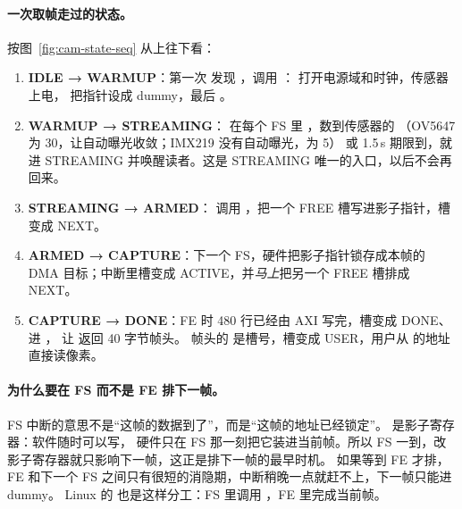 \paragraph{一次取帧走过的状态。}
按图~\ref{fig:cam-state-seq} 从上往下看：
\begin{enumerate}
  \item \textbf{IDLE → WARMUP}：第一次  发现 ，调用 ：
        打开电源域和时钟，传感器上电， 把指针设成 dummy，最后 。
  \item \textbf{WARMUP → STREAMING}： 在每个 FS 里 ，数到传感器的 （OV5647 为 30，让自动曝光收敛；IMX219 没有自动曝光，为 5）
        或 1.5\,s 期限到，就进 STREAMING 并唤醒读者。这是 STREAMING 唯一的入口，以后不会再回来。
  \item \textbf{STREAMING → ARMED}： 调用 ，把一个 FREE 槽写进影子指针，槽变成 NEXT。
  \item \textbf{ARMED → CAPTURE}：下一个 FS，硬件把影子指针锁存成本帧的 DMA 目标；中断里槽变成 ACTIVE，并\emph{马上}把另一个 FREE 槽排成 NEXT。
  \item \textbf{CAPTURE → DONE}：FE 时 480 行已经由 AXI 写完，槽变成 DONE、进 ， 让  返回 40 字节帧头。
        帧头的  是槽号，槽变成 USER，用户从  的地址直接读像素。
\end{enumerate}

\paragraph{为什么要在 FS 而不是 FE 排下一帧。}
FS 中断的意思不是“这帧的数据到了”，而是“这帧的地址已经锁定”。 是影子寄存器：软件随时可以写，
硬件只在 FS 那一刻把它装进当前帧。所以 FS 一到，改影子寄存器就只影响下一帧，这正是排下一帧的最早时机。
如果等到 FE 才排，FE 和下一个 FS 之间只有很短的消隐期，中断稍晚一点就赶不上，下一帧只能进 dummy。
Linux 的  也是这样分工：FS 里调用 ，FE 里完成当前帧。

